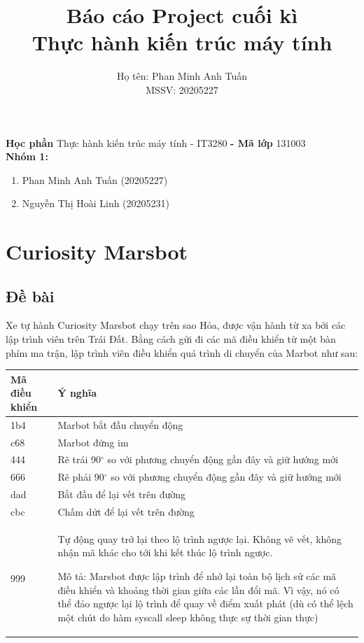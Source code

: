 \documentclass[a4paper,12pt]{article}
\title{\textbf{Báo cáo Project cuối kì \\ Thực hành kiến trúc máy tính}}
\author{Họ tên: Phan Minh Anh Tuấn \\ MSSV: 20205227}
\date{}
\begin{document}
	\maketitle
	\noindent
    \textbf{Học phần} Thực hành kiến trúc máy tính - IT3280 \textbf{- Mã lớp} 131003\\
    \textbf{Nhóm 1:}
    \begin{enumerate}
        \item Phan Minh Anh Tuấn (20205227)
        \item Nguyễn Thị Hoài Linh (20205231)
    \end{enumerate}
    \newpage
	\tableofcontents
	\newpage
	\section{Curiosity Marsbot}
	\subsection{Đề bài}
	Xe tự hành Curiosity Marsbot chạy trên sao Hỏa, được vận hành từ xa bởi các lập trình viên trên Trái Đất. Bằng cách gửi đi các mã điều khiển từ một bàn phím ma trận, lập trình viên điều khiển quá trình di chuyển của Marbot như sau:
	\begin{table}[!h]
		\label{ba1}
		\begin{tabularx}{\textwidth}{|l|X|} \hline
			\textbf{Mã điều khiển} & \textbf{Ý nghĩa}  \\ \hline 
			1b4  & Marbot bắt đầu chuyển động \\ \hline
			c68 & Marbot đứng im\\  \hline
			444 & Rẽ trái 90$^{\circ}$ so với phương chuyển động gần đây và giữ hướng mới\\ \hline
			666 & Rẽ phải 90$^{\circ}$ so với phương chuyển động gần đây và giữ hướng mới\\ \hline
			dad & Bắt đầu để lại vết trên đường\\  \hline
			cbc & Chấm dứt để lại vết trên đường\\  \hline
			999 & 
			Tự động quay trở lại theo lộ trình ngược lại. Không vẽ vết, không nhận mã khác cho tới khi kết thúc lộ trình ngược. 
			
			Mô tả: Marsbot được lập trình để nhớ lại toàn bộ lịch sử các mã điều khiển và khoảng thời gian giữa các lần đổi mã. Vì vậy, nó có thể đảo ngược lại lộ trình để quay về điểm xuất phát (dù có thể lệch một chút do hàm syscall sleep không thực sự thời gian thực)
			\\ \hline 
		\end{tabularx}
	\end{table}
\end{document}
